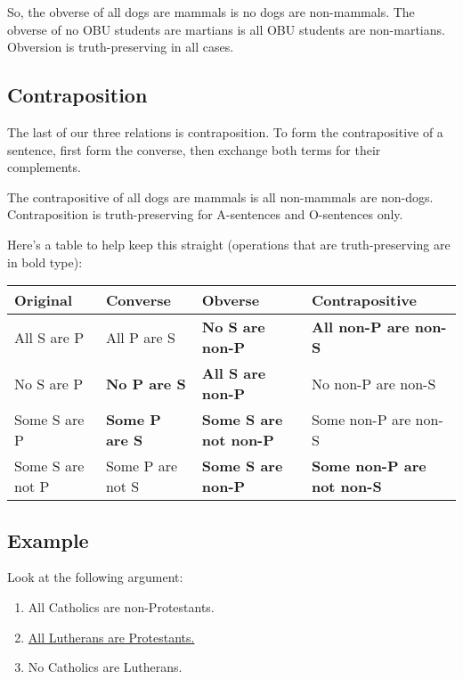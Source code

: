 \documentclass[../logic-text.tex]{subfiles}
\begin{document}
So, the obverse of all dogs are mammals is no dogs are non-mammals. The obverse of no OBU students are martians is all OBU students are non-martians. Obversion is truth-preserving in all cases.

\subsection{Contraposition}

The last of our three relations is contraposition. To form the contrapositive of a sentence, first form the converse, then exchange both terms for their complements.

The contrapositive of all dogs are mammals is all non-mammals are non-dogs. Contraposition is truth-preserving for A-sentences and O-sentences only.

\newpage

Here's a table to help keep this straight (operations that are truth-preserving are in bold type):


\begin{table}[]
\begin{tabular}{@{}llll@{}}
\toprule
Original         & Converse         & Obverse              & Contrapositive           \\ \midrule
All S are P      & All P are S      & \textbf{No S are non-P}       & \textbf{All non-P are non-S}      \\
No S are P       & \textbf{No P are S}       & \textbf{All S are non-P}      & No non-P are non-S       \\
Some S are P     & \textbf{Some P are S}     & \textbf{Some S are not non-P} & Some non-P are non-S     \\
Some S are not P & Some P are not S & \textbf{Some S are non-P}     & \textbf{Some non-P are not non-S} \\ \bottomrule
\end{tabular}
\end{table}

\subsection{Example}

Look at the following argument:

\begin{enumerate}
\item All Catholics are non-Protestants.
\item \underline{All Lutherans are Protestants.}
\item No Catholics are Lutherans.
\end{enumerate}
\end{document}
